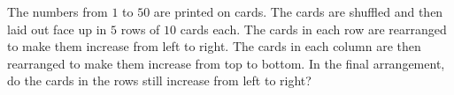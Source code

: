 The numbers from $1$ to $50$ are printed on cards. The cards are shuffled and then laid out face up in $5$ rows of $10$ cards each. The cards in each row are rearranged to make them increase from left to right. The cards in each column are then rearranged to make them increase from top to bottom. In the final arrangement, do the cards in the rows still increase from left to right?